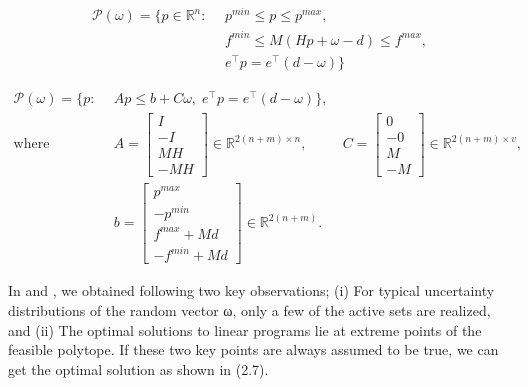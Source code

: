 \documentclass[11pt]{article}
\begin{document}
\begin{align}\label{eq:opf_poly}
\mathcal{P}\left ( \omega \right ) =  \{ p\in\mathbb{R}^{n}:
~ &~p^{min}\leq p\leq p^{max}, \nonumber \\
~ &~ f^{min}\leq M\left ( Hp +\omega -d \right )  \leq f^{max}, \nonumber \\
~ &~ e^{\top }p=e^{\top }\left ( d -\omega  \right )  \}
\end{align}

\begin{align}\label{eq:opf_poly_compact}
\mathcal{P}\left ( \omega \right ) =  \{ p:
~ &~ Ap\leq b+C\omega, \; e^{\top }p=e^{\top }\left ( d -\omega  \right )  \}, \\
\text{where}
~ &~ A=\begin{bmatrix}I\\ -I\\ MH\\ -MH\end{bmatrix} \in \mathbb{R}^{2\left(n+m\right)\times n},
~ &~ C=\begin{bmatrix}0\\ -0\\ M\\ -M\end{bmatrix} \in \mathbb{R}^{2\left(n+m\right)\times v}, \nonumber \\
~ &~ b=\begin{bmatrix}p^{max}\\ -p^{min}\\ f^{max}+Md\\ -f^{min}+Md\end{bmatrix} \in \mathbb{R}^{2\left(n+m\right)}. \nonumber
\end{align}

In \cite{statistical_learning} and \cite{learing_constrained_op}, we obtained following two key observations; (i) For typical uncertainty distributions of the random vector ω, only a few of the active sets are realized, and (ii) The optimal solutions to linear programs lie at extreme points of the feasible polytope. If these two key points are always assumed to be true, we can get the optimal solution as shown in (2.7).
\end{document}
